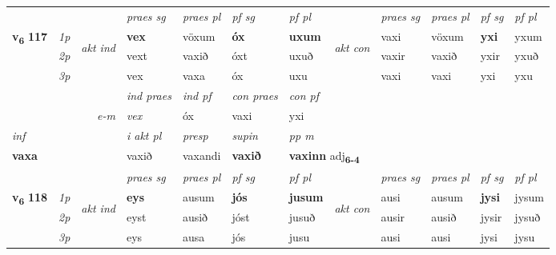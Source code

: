 \begin{longtable}[l]{X>{\footnotesize\itshape}llXXXXlXXXX}
\midrule

 & &   & \textit{praes sg}  & \textit{praes pl}    & \textit{ pf sg} & \textit{pf pl} & & \textit{praes sg}  & \textit{praes pl}    & \textit{pf sg} & \textit{pf pl }  \\ \cmidrule{4-7} \cmidrule{9-12}
 \multirow{2}{*}{{{\textbf{v{\textsubscript{6}}} \Large{\textbf{117}}}}}  & 1p & \multirow{3}{*}{\begin{turn}{90}\textit{akt ind}\end{turn}} & \textbf{vex} & vöxum & \textbf{óx} & \textbf{uxum} & \multirow{3}{*}{\begin{turn}{90}\textit{akt con}\end{turn}} &vaxi & vöxum & \textbf{yxi} & yxum\\*
 & 2p &  &  vext  & vaxið & óxt & uxuð & & vaxir & vaxið & yxir & yxuð \\*
 & 3p &  & vex & vaxa & óx & uxu & & vaxi & vaxi& yxi & yxu \\*
\cmidrule{4-7} \cmidrule{9-12}

   && &  \textit{ind praes} & \textit{ind pf} & \textit{con praes} & \textit{con pf} \\*
\multicolumn{3}{r}{\textit{e-m}} & vex & óx & vaxi & yxi \\*

\cmidrule{4-7}
   {\textit{inf}} & &  & \textit{i akt pl}   & \textit{presp} & \textit{supin}  & \textit{pp m} \\*
  {\textbf{vaxa}} & &  & vaxið   & vaxandi &  \textbf{vaxið}  & \multicolumn{2}{l}{\textbf{vaxinn} adj\textbf{\textsubscript{6-4}}} \\*

\midrule

 & &   & \textit{praes sg}  & \textit{praes pl}    & \textit{ pf sg} & \textit{pf pl} & & \textit{praes sg}  & \textit{praes pl}    & \textit{pf sg} & \textit{pf pl }  \\ \cmidrule{4-7} \cmidrule{9-12}
 \multirow{2}{*}{{{\textbf{v{\textsubscript{6}}} \Large{\textbf{118}}}}}  & 1p & \multirow{3}{*}{\begin{turn}{90}\textit{akt ind}\end{turn}} & \textbf{eys} & ausum & \textbf{jós} & \textbf{jusum} & \multirow{3}{*}{\begin{turn}{90}\textit{akt con}\end{turn}} &ausi & ausum & \textbf{jysi} & jysum\\*
 & 2p &  &  eyst  & ausið & jóst & jusuð & & ausir & ausið & jysir & jysuð \\*
 & 3p &  & eys & ausa & jós & jusu & & ausi & ausi& jysi & jysu \\*
\cmidrule{4-7} \cmidrule{9-12}


\end{longtable}
